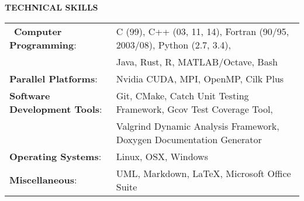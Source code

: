 \documentclass[legalpaper]{article}
\begin{document}
\begin{center}
  \begin{shaded}
    { \color{white} \textbf{ TECHNICAL SKILLS}}
  \end{shaded}
\end{center}
\begin{tabular}{l p{5in}}
  ~\textbf{Computer Programming}: &  C (99), C++ (03, 11, 14), Fortran (90/95, 2003/08), Python (2.7, 3.4),\\
  & Java, Rust, R, MATLAB/Octave, Bash\\
  \rule{0pt}{4ex} \textbf{Parallel Platforms}:   &  Nvidia CUDA, MPI, OpenMP, Cilk Plus\\
  \rule{0pt}{4ex} \textbf{Software Development Tools}:    &  Git, CMake, Catch Unit Testing Framework, Gcov Test Coverage Tool,\\
  & Valgrind Dynamic Analysis Framework, Doxygen Documentation Generator\\
  \rule{0pt}{4ex} \textbf{Operating Systems}:    &  Linux, OSX, Windows\\
  \rule{0pt}{4ex} \textbf{Miscellaneous}:        &  UML, Markdown, \LaTeX, Microsoft Office Suite\\
\end{tabular}



\end{document}
